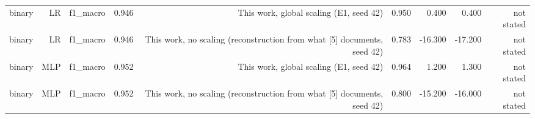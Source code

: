 \begin{table}[htbp]
{\begin{tabular}{lrrrrrrrr}
binary & LR & f1\_macro & 0.946 & This work, global scaling (E1, seed 42) & 0.950 & 0.400 & 0.400 & not stated \\
binary & LR & f1\_macro & 0.946 & This work, no scaling (reconstruction from what [5] documents, seed 42) & 0.783 & -16.300 & -17.200 & not stated \\
binary & MLP & f1\_macro & 0.952 & This work, global scaling (E1, seed 42) & 0.964 & 1.200 & 1.300 & not stated \\
binary & MLP & f1\_macro & 0.952 & This work, no scaling (reconstruction from what [5] documents, seed 42) & 0.800 & -15.200 & -16.000 & not stated \\
\bottomrule
\end{tabular}}
\end{table}
